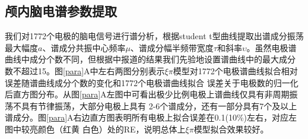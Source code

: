 \subsection{颅内脑电谱参数提取}
我们对1772个电极的脑电信号进行谱分析，根据student t型曲线提取出谱成分振荡最大幅度$a$、谱成分共振中心频率$\mu$、谱成分幅半频带宽度$
\tau$和斜率$\upsilon$。虽然电极谱曲线中成分个数不同，但根据\cite{frauscher2018atlas}中报道的结果我们先验地设置谱曲线中的最大成分
数不超过15。图\ref{para}A中左右两图分别表示$\xi\pi$模型对1772个电极谱曲线拟合相对误差随谱曲线成分个数的变化和1772个电极谱曲线拟合
误差关于电极数的归一化后直方图分布。从图\ref{para}A左图中可看出极少比例电极上谱曲线仅具有非周期振荡不具有节律振荡，大部分电极上具有
2-6个谱成分，还有一部分具有7个及以上谱成分。图\ref{para}A右边直方图表明所有电极上拟合误差在0.1(10\%)左右，对应左图中较亮颜色（红黄
白色）处的RE，说明总体上$\xi\pi$模型拟合效果较好。

